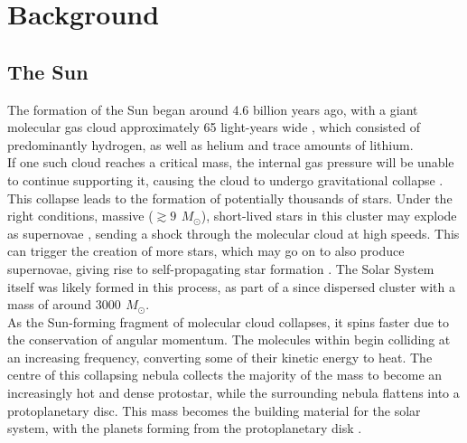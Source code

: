 \documentclass[11pt,a4paper,onecolumn]{report}
\begin{document}




%
%
%
%
%
%
\chapter{Background}
%
%
%
%
%
%


%
%
%
%
%
%

\section{The Sun}
\label{sec:Sun}

The formation of the Sun began around 4.6 billion years ago, with a giant
molecular gas cloud approximately 65 light-years wide
\citep{montmerle_solar_2006}, which consisted of predominantly hydrogen, as well
as helium and trace amounts of lithium. \\

If one such cloud reaches a critical mass, the internal gas pressure will be
unable to continue supporting it, causing the cloud to undergo gravitational
collapse \citep{jeans_stability_1902}. This collapse leads to the formation of
potentially thousands of stars. Under the right conditions, massive (\(\gtrsim
\SI{9}{\,M_\odot} \)), short-lived stars in this cluster may explode as
supernovae \citep{heger_how_2003}, sending a shock through the molecular cloud
at high speeds. This can trigger the creation of more stars, which may go on to
also produce supernovae, giving rise to self-propagating star formation
\citep{mueller_propagating_1976}. The Solar System itself was likely formed in
this process, as part of a since dispersed cluster with a mass of around
\(\SI{3000}{\,M_\odot} \)\citep{williams_astrophysical_2010,zwart_lost_2009}. \\

As the Sun-forming fragment of molecular cloud collapses, it spins faster due to
the conservation of angular momentum. The molecules within begin colliding at an
increasing frequency, converting some of their kinetic energy to heat. The
centre of this collapsing nebula collects the majority of the mass to become an
increasingly hot and dense protostar, while the surrounding nebula flattens into
a protoplanetary disc. This mass becomes the building material for the solar
system, with the planets forming from the protoplanetary disk
\citep{greaves_disks_2005}. \\
\end{document}
